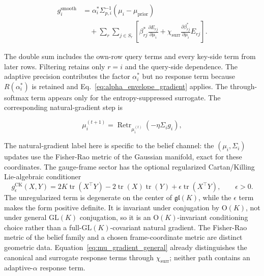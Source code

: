 \documentclass[twoside,11pt]{article}
\begin{document}
\begin{equation}
\boxed{
\begin{aligned}
g_i^{\mathrm{smooth}}
&=\alpha_i^*\Sigma_{p,i}^{-1}
(\mu_i-\mu_{\mathrm{prior}})\\
&\quad+\sum_r\sum_{j\in S_r}
\left[
\beta_{rj}^*\frac{\partial E_{rj}}{\partial\mu_i}
+\chi_{\mathrm{surr}}
\frac{\partial\beta_{rj}^*}{\partial\mu_i}E_{rj}
\right].
\end{aligned}
}
\label{eq:mu_gradient_general}
\end{equation}

The double sum includes the own-row query terms and every key-side term from later rows. Filtering retains only $r=i$ and the query-side dependence. The adaptive precision contributes the factor $\alpha_i^*$ but no response term because $R(\alpha_i^*)$ is retained and Eq.~\eqref{eq:alpha_envelope_gradient} applies. The through-softmax term appears only for the entropy-suppressed surrogate. The corresponding natural-gradient step is

\begin{equation}
\boxed{
\mu_i^{(t+1)}
=\operatorname{Retr}_{\mu_i^{(t)}}
\left(-\eta\Sigma_i g_i\right),
}
\label{eq:natural_gradient_general}
\end{equation}

The natural-gradient label here is specific to the belief channel: the $(\mu_i, \Sigma_i)$ updates use the Fisher-Rao metric of the Gaussian manifold, exact for these coordinates. The gauge-frame sector has the optional regularized Cartan/Killing Lie-algebraic conditioner
\begin{equation}
g_{\epsilon}^{\mathrm{CK}}(X,Y)
=2K\operatorname{tr}(X^\top Y)-2\operatorname{tr}(X)\operatorname{tr}(Y)
+\epsilon\operatorname{tr}(X^\top Y),
\qquad \epsilon>0.
\label{eq:regularized_cartan_killing_preconditioner}
\end{equation}
The unregularized term is degenerate on the center of $\mathfrak{gl}(K)$, while the $\epsilon$ term makes the form positive definite. It is invariant under conjugation by $\mathrm{O}(K)$, not under general $\mathrm{GL}(K)$ conjugation, so it is an $\mathrm{O}(K)$-invariant conditioning choice rather than a full-$\mathrm{GL}(K)$-covariant natural gradient. The Fisher-Rao metric of the belief family and a chosen frame-coordinate metric are distinct geometric data. Equation~\eqref{eq:mu_gradient_general} already distinguishes the canonical and surrogate response terms through $\chi_{\mathrm{surr}}$; neither path contains an adaptive-$\alpha$ response term.
\end{document}
